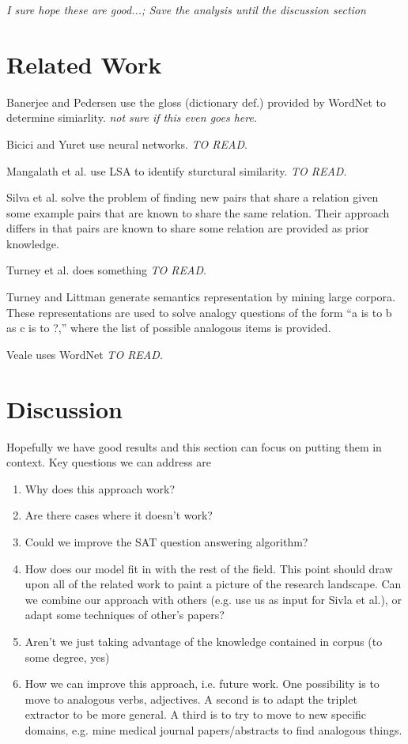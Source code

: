 \documentclass[11pt]{article}
\begin{document}
\emph{I sure hope these are good...; Save the analysis until the discussion
  section}

\section{Related Work}

Banerjee and Pedersen\cite{banerjee03extendedgloss} use the gloss (dictionary
def.) provided by WordNet to determine simiarlity.  \emph{not sure if this even
  goes here}.

Bicici and Yuret \cite{bicici06clustering} use neural networks. \emph{TO READ}.

Mangalath et al. \cite{mangalath04analogy} use LSA to identify sturctural
similarity. \emph{TO READ}.

Silva et al. \cite{silva07analogical} solve the problem of finding new pairs
that share a relation given some example pairs that are known to share the same
relation.  Their approach differs in that pairs are known to share some relation
are provided as prior knowledge.

Turney et al. \cite{turney03combining} does something \emph{TO READ}.

Turney and Littman\cite{turney05corpus} generate semantics representation by
mining large corpora.  These representations are used to solve analogy questions of
the form ``a is to b as c is to ?,'' where the list of possible analogous items
is provided.

Veale \cite{veale04wordnet} uses WordNet \emph{TO READ.}

\section{Discussion}

Hopefully we have good results and this section can focus on putting them in
context.  Key questions we can address are
\begin{enumerate}
  \item Why does this approach work?
  \item Are there cases where it doesn't work?
  \item Could we improve the SAT question answering algorithm?
  \item How does our model fit in with the rest of the field.  This point should
    draw upon all of the related work to paint a picture of the research
    landscape.  Can we combine our approach with others (e.g. use us as input
    for Sivla et al.), or adapt some techniques of other's papers?
  \item Aren't we just taking advantage of the knowledge contained in corpus (to
    some degree, yes)
  \item How we can improve this approach, i.e. future work.  One possibility is
    to move to analogous verbs, adjectives.  A second is to adapt the triplet
    extractor to be more general.  A third is to try to move to new specific
    domains, e.g. mine medical journal papers/abstracts to find analogous
    things.
\end{enumerate}
\end{document}
